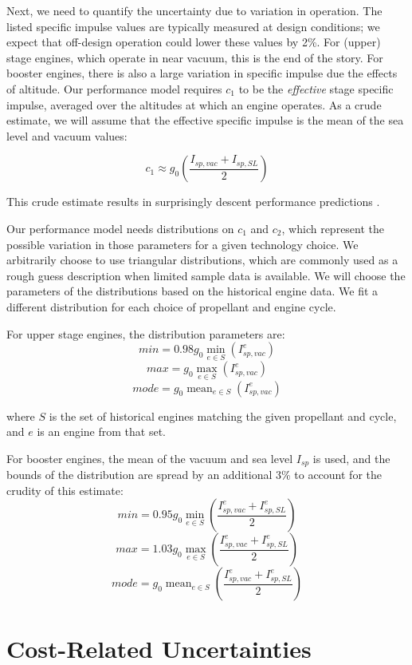 \documentclass[conf]{../paper/new-aiaa}
\DeclareMathOperator*{\mean}{mean}
\begin{document}
Next, we need to quantify the uncertainty due to variation in operation. The listed specific impulse values are typically measured at design conditions; we expect that off-design operation could lower these values by 2\%. For  (upper) stage engines, which operate in near vacuum, this is the end of the story. For booster engines, there is also a large variation in specific impulse due the effects of altitude. Our performance model requires $c_1$ to be the \emph{effective}  stage specific impulse, averaged over the altitudes at which an engine operates. As a crude estimate, we will assume that the effective specific impulse is the mean of the sea level and vacuum values:

\[
    c_1 \approx g_0 \left( \frac{I_{sp, vac} + I_{sp, SL}}{2} \right)
\]

This crude estimate results in surprisingly descent performance predictions \cite{Alber2012}. 

Our performance model needs distributions on $c_1$ and $c_2$, which represent the possible variation in those parameters for a given technology choice. We arbitrarily choose to use triangular distributions, which are commonly used as a rough guess description when limited sample data is available. We will choose the parameters of the distributions based on the historical engine data. We fit a different distribution for each choice of propellant and engine cycle.

For upper stage engines, the distribution parameters are:
\[
 min = 0.98 g_0 \min_{e \in S}(I_{sp, vac}^{e})
\]
\[
 max = g_0 \max_{e \in S}(I_{sp, vac}^{e})
\]
\[
 mode = g_0 \mean_{e \in S}(I_{sp, vac}^{e})
\]

where $S$ is the set of historical engines matching the given propellant and cycle, and $e$ is an engine from that set.

For booster engines, the mean of the vacuum and sea level $I_{sp}$ is used, and the bounds of the distribution are spread by an additional 3\% to account for the crudity of this estimate:
\[
 min = 0.95 g_0 \min_{e \in S}\left( \frac{I_{sp, vac}^e + I_{sp, SL}^e}{2} \right)
\]
\[
 max = 1.03 g_0 \max_{e \in S}\left( \frac{I_{sp, vac}^e + I_{sp, SL}^e}{2} \right)
\]
\[
 mode = g_0 \mean_{e \in S}\left( \frac{I_{sp, vac}^e + I_{sp, SL}^e}{2} \right)
\]

\section{Cost-Related Uncertainties}




\end{document}
